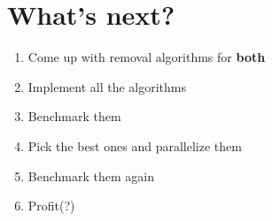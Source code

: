 \chapter{What's next?}

\begin{enumerate}
    \item Come up with removal algorithms for \textbf{both}
    \item Implement all the algorithms
    \item Benchmark them
    \item Pick the best ones and parallelize them
    \item Benchmark them again
    \item Profit(?)
\end{enumerate}
